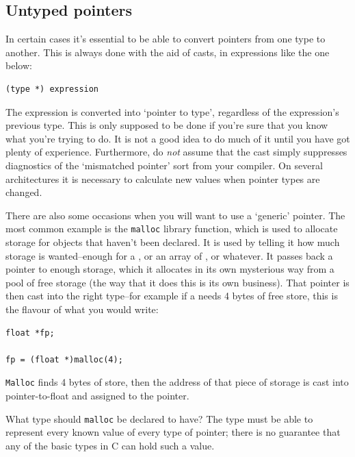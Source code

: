   

  \subsection{Untyped pointers}
   

   In certain cases it's essential to be able to convert pointers from
    one type to another. This is always done with the aid of casts, in
    expressions like the one below:


   \begin{Verbatim}
(type *) expression
\end{Verbatim}

   The expression is converted into `pointer to
    type', regardless of the expression's previous type. This
    is only supposed to be done if you're sure that you know what you're
    trying to do. It is not a good idea to do much of it until you have got
    plenty of experience. Furthermore, do \textit{not} assume that the cast
    simply suppresses diagnostics of the `mismatched pointer' sort
    from your compiler. On several architectures it is necessary to
    calculate new values when pointer types are changed.


   There are also some occasions when you will want to use
    a `generic' pointer. The most common example is the
    \texttt{malloc} library function, which is used to allocate storage
    for objects that haven't been declared. It is used by telling it how
    much storage is wanted--enough for a \float, or an array
    of \kint, or whatever. It passes back a pointer to enough
    storage, which it allocates in its own mysterious way from a pool of
    free storage (the way that it does this is its own business). That
    pointer is then cast into the right type--for example if
    a \float{} needs 4 bytes of free store, this is the flavour of
    what you would write:


   \begin{Verbatim}
float *fp;

fp = (float *)malloc(4);
\end{Verbatim}

   \texttt{Malloc} finds 4 bytes of store, then the address of that
    piece of storage is cast into pointer-to-float and assigned to the
    pointer.


   What type should \texttt{malloc} be declared to have? The type
    must be able to represent every known value of every type of pointer;
    there is no guarantee that any of the basic types in C can hold such
    a value.


